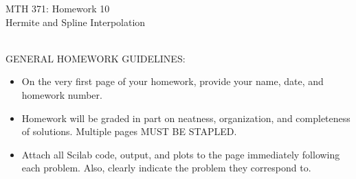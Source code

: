 \documentclass[addpoints, 11pt]{exam}
\begin{document}
\vspace{100mm}
\begin{center} \Large
MTH 371: Homework 10 \\ Hermite and Spline Interpolation \normalsize
\end{center}
\ \\
\noindent GENERAL HOMEWORK GUIDELINES: 
\begin{itemize}
\item On the very first page of your homework, provide your name, date, and homework number.\vspace{-2mm}
\item Homework will be graded in part on neatness, organization, and completeness of solutions. Multiple pages MUST BE STAPLED. \vspace{-2mm}
\item Attach all Scilab code, output, and plots to the page immediately following each problem. Also, clearly indicate the problem they correspond to.
\end{itemize}
\end{document}
